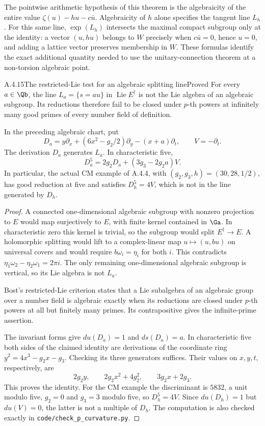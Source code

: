 The pointwise arithmetic hypothesis of this theorem is the algebraicity of the entire value $\zeta(u)-hu-c\bar u$. Algebraicity of $h$ alone specifies the tangent line $L_h$. For this same line, $\exp(L_h)$ intersects the maximal compact subgroup only at the identity: a vector $(u,hu)$ belongs to $W$ precisely when $c\bar u=0$, hence $u=0$, and adding a lattice vector preserves membership in $W$. These formulas identify the exact additional quantity needed to use the unitary-connection theorem at a non-torsion algebraic point.

\begin{result}{A.4.15}{The restricted-Lie test for an algebraic splitting line}{Proved}
For every $a\in\Qb$, the line $L_a=\{s=au\}$ in $\operatorname{Lie}E^\dagger$ is not the Lie algebra of an algebraic subgroup. Its reductions therefore fail to be closed under $p$-th powers at infinitely many good primes of every number field of definition.

In the preceding algebraic chart, put
\[
 D_a=y\partial_x+(6x^2-g_2/2)\partial_y-(x+a)\partial_t,
 \qquad V=-\partial_t.
\]
The derivation $D_a$ generates $L_a$. In characteristic five,
\[
 D_a^5=2g_2D_a+(3g_3-2g_2a)V.
\]
In particular, the actual CM example of A.4.4, with $(g_2,g_3,h)=(30,28,1/2)$, has good reduction at five and satisfies $D_h^5=4V$, which is not in the line generated by $D_h$.
\end{result}
\begin{proof}
A connected one-dimensional algebraic subgroup with nonzero projection to $E$ would map surjectively to $E$, with finite kernel contained in $\Ga$. In characteristic zero this kernel is trivial, so the subgroup would split $E^\dagger\to E$. A holomorphic splitting would lift to a complex-linear map $u\mapsto(u,bu)$ on universal covers and would require $b\omega_i=\eta_i$ for both $i$. This contradicts $\eta_1\omega_2-\eta_2\omega_1=2\pi i$. The only remaining one-dimensional algebraic subgroup is vertical, so its Lie algebra is not $L_a$.

Bost's restricted-Lie criterion \cite[Theorem 2.3, p.172]{EllBost2001} states that a Lie subalgebra of an algebraic group over a number field is algebraic exactly when its reductions are closed under $p$-th powers at all but finitely many primes. Its contrapositive gives the infinite-prime assertion.

The invariant forms give $du(D_a)=1$ and $ds(D_a)=a$. In characteristic five both sides of the claimed identity are derivations of the coordinate ring $y^2=4x^3-g_2x-g_3$. Checking its three generators suffices. Their values on $x,y,t$, respectively, are
\[
 2g_2y,\qquad 2g_2x^2+4g_2^2,\qquad 3g_2x+2g_3.
\]
This proves the identity. For the CM example the discriminant is $5832$, a unit modulo five, $g_2=0$ and $g_3=3$ modulo five, so $D_h^5=4V$. Since $du(D_h)=1$ but $du(V)=0$, the latter is not a multiple of $D_h$. The computation is also checked exactly in \texttt{code/check\_p\_curvature.py}.
\end{proof}

